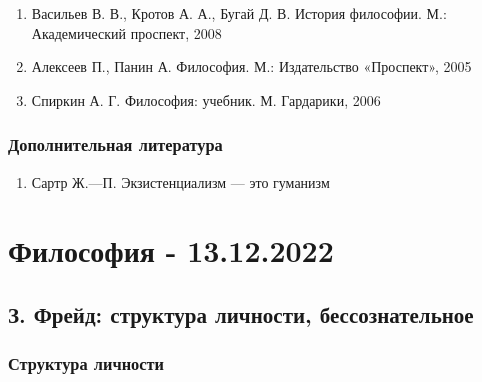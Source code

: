 \documentclass{article}
\begin{document}
\begin{enumerate}
    \item Васильев В. В., Кротов А. А., Бугай Д. В. История философии. М.: Академический проспект, 2008
    \item Алексеев П., Панин А. Философия. М.: Издательство «Проспект», 2005
    \item Спиркин А. Г. Философия: учебник. М. Гардарики, 2006
\end{enumerate}

\subsubsection{Дополнительная литература}

\begin{enumerate}
    \item Сартр Ж.—П. Экзистенциализм — это гуманизм
\end{enumerate}

\pagebreak
\section{Философия - 13.12.2022}

\subsection{З. Фрейд: структура личности, бессознательное}

\subsubsection{Структура личности}
\end{document}
